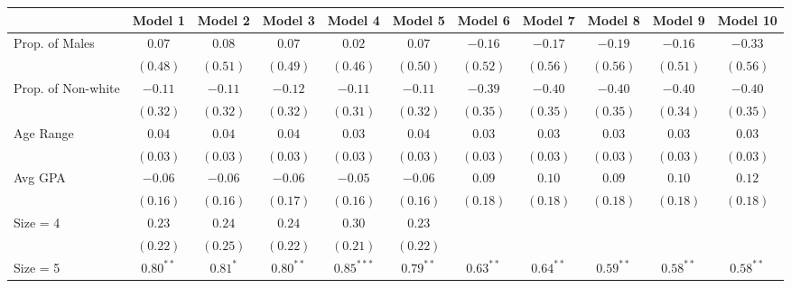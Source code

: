 \documentclass[
]{article}
\begin{document}
\begin{landscape}

\begin{table}
\begin{center}
\begin{tabular}{l c c c c c c c c c c }
\hline
 & Model 1 & Model 2 & Model 3 & Model 4 & Model 5 & Model 6 & Model 7 & Model 8 & Model 9 & Model 10 \\
\hline
Prop. of Males             & $0.07$      & $0.08$     & $0.07$      & $0.02$       & $0.07$      & $-0.16$     & $-0.17$     & $-0.19$     & $-0.16$     & $-0.33$     \\
                           & $(0.48)$    & $(0.51)$   & $(0.49)$    & $(0.46)$     & $(0.50)$    & $(0.52)$    & $(0.56)$    & $(0.56)$    & $(0.51)$    & $(0.56)$    \\
Prop. of Non-white         & $-0.11$     & $-0.11$    & $-0.12$     & $-0.11$      & $-0.11$     & $-0.39$     & $-0.40$     & $-0.40$     & $-0.40$     & $-0.40$     \\
                           & $(0.32)$    & $(0.32)$   & $(0.32)$    & $(0.31)$     & $(0.32)$    & $(0.35)$    & $(0.35)$    & $(0.35)$    & $(0.34)$    & $(0.35)$    \\
Age Range                  & $0.04$      & $0.04$     & $0.04$      & $0.03$       & $0.04$      & $0.03$      & $0.03$      & $0.03$      & $0.03$      & $0.03$      \\
                           & $(0.03)$    & $(0.03)$   & $(0.03)$    & $(0.03)$     & $(0.03)$    & $(0.03)$    & $(0.03)$    & $(0.03)$    & $(0.03)$    & $(0.03)$    \\
Avg GPA                    & $-0.06$     & $-0.06$    & $-0.06$     & $-0.05$      & $-0.06$     & $0.09$      & $0.10$      & $0.09$      & $0.10$      & $0.12$      \\
                           & $(0.16)$    & $(0.16)$   & $(0.17)$    & $(0.16)$     & $(0.16)$    & $(0.18)$    & $(0.18)$    & $(0.18)$    & $(0.18)$    & $(0.18)$    \\
Size = 4                   & $0.23$      & $0.24$     & $0.24$      & $0.30$       & $0.23$      &             &             &             &             &             \\
                           & $(0.22)$    & $(0.25)$   & $(0.22)$    & $(0.21)$     & $(0.22)$    &             &             &             &             &             \\
Size = 5                   & $0.80^{**}$ & $0.81^{*}$ & $0.80^{**}$ & $0.85^{***}$ & $0.79^{**}$ & $0.63^{**}$ & $0.64^{**}$ & $0.59^{**}$ & $0.58^{**}$ & $0.58^{**}$ \\

\end{tabular}
\end{center}
\end{table}
\end{landscape}
\end{document}
